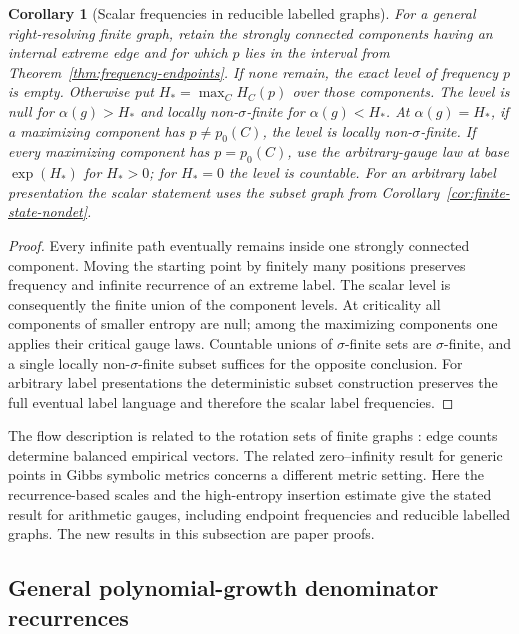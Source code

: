 \documentclass[11pt]{article}
\newtheorem{corollary}[theorem]{Corollary}
\theoremstyle{definition}
\theoremstyle{remark}
\begin{document}
\begin{corollary}[Scalar frequencies in reducible labelled graphs]
\label{cor:reducible-frequency-rates}
For a general right-resolving finite graph, retain the strongly
connected components having an internal extreme edge and for
which $p$ lies in the interval from
Theorem~\ref{thm:frequency-endpoints}. If none remain, the
exact level of frequency $p$ is empty. Otherwise put
$H_*=\max_C H_C(p)$ over those components.
The level is null for $\alpha(g)>H_*$ and locally
non-$\sigma$-finite for $\alpha(g)<H_*$. At $\alpha(g)=H_*$,
if a maximizing component has $p\ne p_0(C)$, the level is
locally non-$\sigma$-finite. If every maximizing component
has $p=p_0(C)$, use the arbitrary-gauge law at base
$\exp(H_*)$ for $H_*>0$; for $H_*=0$ the level is countable.
For an arbitrary label presentation the scalar statement uses
the subset graph from Corollary~\ref{cor:finite-state-nondet}.
\end{corollary}
\begin{proof}
Every infinite path eventually remains inside one strongly
connected component. Moving the starting point by finitely many
positions preserves frequency and infinite recurrence of an
extreme label. The scalar level is consequently the finite
union of the component levels. At criticality all components
of smaller entropy are null; among the maximizing components
one applies their critical gauge laws. Countable unions of
$\sigma$-finite sets are $\sigma$-finite, and a single locally
non-$\sigma$-finite subset suffices for the opposite conclusion.
For arbitrary label presentations the deterministic subset
construction preserves the full eventual label language and
therefore the scalar label frequencies.
\end{proof}

The flow description is related to the rotation sets of finite
graphs \cite{ZiemianRotation}: edge counts determine balanced empirical vectors.
The related zero--infinity result for generic points in Gibbs
symbolic metrics \cite{GenericZeroInfinity} concerns a different
metric setting. Here the recurrence-based scales and the
high-entropy insertion estimate give the stated result for
arithmetic gauges, including endpoint frequencies and reducible
labelled graphs. The new results in this subsection are paper proofs.


\subsection{General polynomial-growth denominator recurrences}\label{sec:poly-rec}
\end{document}

